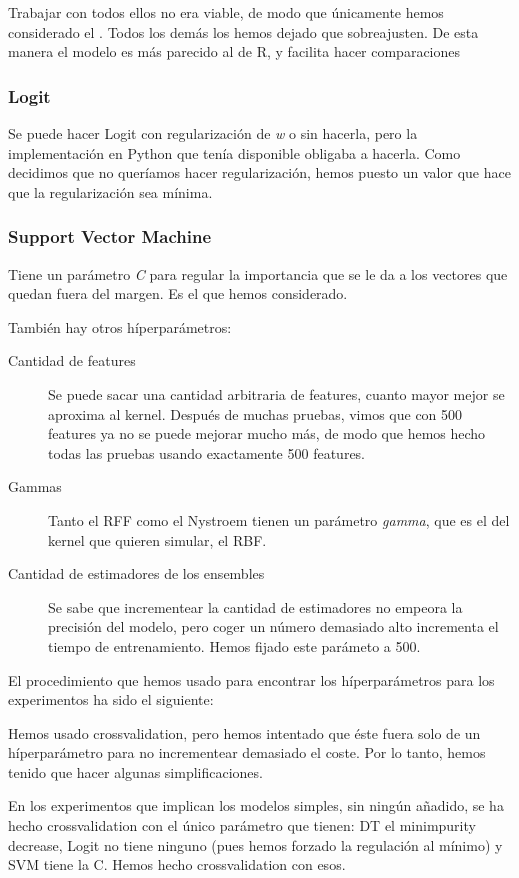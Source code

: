 Trabajar con todos ellos no era viable, de modo que únicamente hemos considerado
el . Todos los demás los hemos dejado que
sobreajusten. De esta manera el modelo es más parecido al de R, y facilita hacer
comparaciones
\subsubsection*{Logit}
Se puede hacer Logit con regularización de \textit{w} o sin hacerla, pero la
implementación en Python que tenía disponible obligaba a hacerla. Como decidimos
que no queríamos hacer regularización, hemos puesto un valor que hace que la
regularización sea mínima.

\subsubsection*{Support Vector Machine}

Tiene un parámetro \textit{C} para regular la importancia que se le da a los
vectores que quedan fuera del margen. Es el que hemos considerado.

También hay otros híperparámetros:

\begin{description}
  \item[Cantidad  de features] Se puede sacar una cantidad arbitraria de
  features, cuanto mayor mejor se aproxima al kernel. Después de muchas pruebas,
  vimos que con 500 features ya no se puede mejorar mucho más, de modo que
  hemos hecho todas las pruebas usando exactamente 500 features.
  \item[Gammas] Tanto el RFF como el Nystroem tienen un parámetro \textit{gamma},
  que es el del kernel que quieren simular, el RBF.
  \item[Cantidad de estimadores de los ensembles] Se sabe que incrementear la
  cantidad de estimadores no empeora la precisión del modelo, pero coger un
  número demasiado alto incrementa el tiempo de entrenamiento. Hemos fijado
  este parámeto a 500.
\end{description}

El procedimiento que hemos usado para encontrar los híperparámetros para los
experimentos ha sido el siguiente:

Hemos usado crossvalidation, pero hemos intentado que éste fuera solo de un
híperparámetro para no incrementear demasiado el coste. Por lo tanto, hemos
tenido que hacer algunas simplificaciones.

En los experimentos que implican los modelos simples, sin ningún añadido, se
ha hecho crossvalidation con el único parámetro que tienen: DT el min\tu impurity
\tu decrease, Logit no tiene ninguno (pues hemos forzado la regulación al
mínimo) y SVM tiene la C. Hemos hecho crossvalidation con esos.

